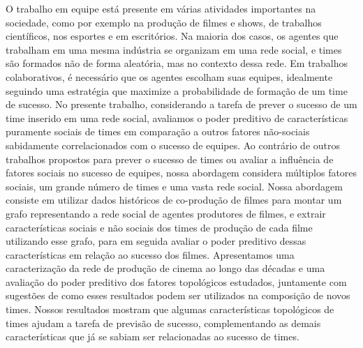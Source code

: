 O trabalho em equipe está presente em várias atividades importantes na
sociedade, como por exemplo na produção de filmes e shows, de trabalhos
científicos, nos esportes e em escritórios. Na maioria dos casos, os agentes
que trabalham em uma mesma indústria se organizam em uma rede social, e times
são formados não de forma aleatória, mas no contexto dessa rede. Em trabalhos
colaborativos, é necessário que os agentes escolham suas equipes, idealmente
seguindo uma estratégia que maximize a probabilidade de formação de um time de
sucesso. No presente trabalho, considerando a tarefa de prever o sucesso de um
time inserido em uma rede social, avaliamos o poder preditivo de
características puramente sociais de times em comparação a outros fatores
não-sociais sabidamente correlacionados com o sucesso de equipes. Ao contrário
de outros trabalhos propostos para prever o sucesso de times ou avaliar a
influência de fatores sociais no sucesso de equipes, nossa abordagem considera
múltiplos fatores sociais, um grande número de times e uma vasta rede social.
Nossa abordagem consiste em utilizar dados históricos de co-produção de filmes
para montar um grafo representando a rede social de agentes produtores de
filmes, e extrair características sociais e não sociais dos times de produção
de cada filme utilizando esse grafo, para em seguida avaliar o poder preditivo
dessas características em relação ao sucesso dos filmes. Apresentamos uma
caracterização da rede de produção de cinema ao longo das décadas e uma
avaliação do poder preditivo dos fatores topológicos estudados, juntamente com
sugestões de como esses resultados podem ser utilizados na composição de novos
times. Nossos resultados mostram que algumas características topológicos de
times ajudam a tarefa de previsão de sucesso, complementando as demais
características que já se sabiam ser relacionadas ao sucesso de times.

